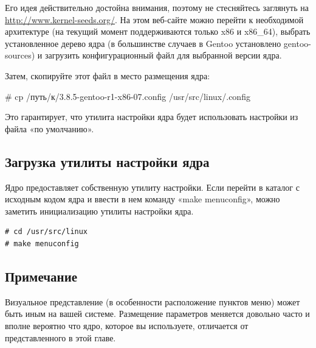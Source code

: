 \documentclass[10pt]{book}
\begin{document}
Его идея действительно достойна внимания, поэтому не стесняйтесь заглянуть на \url{http://www.kernel-seeds.org/}. На этом веб-сайте можно перейти к необходимой архитектуре (на текущий момент поддерживаются только x86 и x86\_64), выбрать установленное дерево ядра (в большинстве случаев в Gentoo установлено gentoo-sources) и загрузить конфигурационный файл для выбранной версии ядра.

Затем, скопируйте этот файл в место размещения ядра:

\vspace{3mm}
\begin{tcolorbox}
\# cp /путь/к/3.8.5-gentoo-r1-x86-07.config /usr/src/linux/.config
\end{tcolorbox}

Это гарантирует, что утилита настройки ядра будет использовать настройки из файла «по умолчанию».

\subsection{Загрузка утилиты настройки ядра}

Ядро предоставляет собственную утилиту настройки. Если перейти в каталог с исходным кодом ядра и ввести в нем команду «make menuconfig»,  можно заметить инициализацию утилиты настройки ядра. 

\vspace{3mm}
\begin{tcolorbox}
\begin{lstlisting}
# cd /usr/src/linux
# make menuconfig
\end{lstlisting}
\end{tcolorbox}

\subsection{Примечание}

Визуальное представление (в особенности расположение пунктов меню) может быть иным на вашей системе. Размещение параметров меняется довольно часто и вполне вероятно что ядро, которое вы используете, отличается от представленного в этой главе. 
\end{document}
